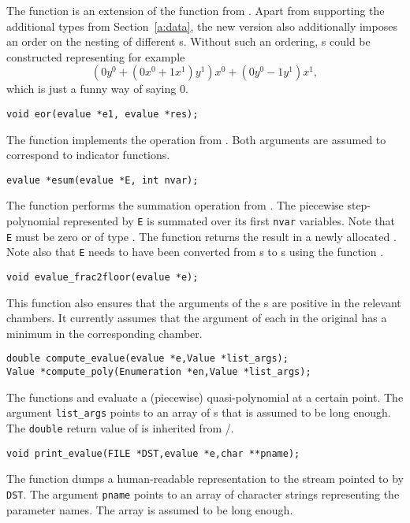 The function  is an extension of the function
 from .
Apart from supporting the additional types from Section~\ref{a:data},
the new version also additionally imposes an order on the nesting of
different s.
Without such an ordering, s could be constructed
representing for example
$$
(0 y^ 0 + ( 0 x^0 + 1 x^1 ) y^1 ) x^0 + (0 y^0 - 1 y^1) x^1
,
$$
which is just a funny way of saying $0$.

\begin{verbatim}
void eor(evalue *e1, evalue *res);
\end{verbatim}
The function  implements the 
operation from .  Both arguments
are assumed to correspond to indicator functions.

\begin{verbatim}
evalue *esum(evalue *E, int nvar);
\end{verbatim}
The function  performs the summation
operation from .
The piecewise step-polynomial represented by \verb+E+ is summated
over its first \verb+nvar+ variables.
Note that \verb+E+ must be zero or of type .
The function returns the result in a newly allocated 
.
Note also that \verb+E+ needs to have been converted
from s to s using
the function .
\begin{verbatim}
void evalue_frac2floor(evalue *e);
\end{verbatim}
This function also ensures that the arguments of the
s are positive in the relevant chambers.
It currently assumes that the argument of each
 in the original 
has a minimum in the corresponding chamber.

\begin{verbatim}
double compute_evalue(evalue *e,Value *list_args);
Value *compute_poly(Enumeration *en,Value *list_args);
\end{verbatim}
The functions  and
 evaluate a (piecewise) quasi-polynomial
at a certain point.  The argument \verb+list_args+
points to an array of s that is assumed
to be long enough.
The \verb+double+ return value of 
is inherited from \PolyLib/.

\begin{verbatim}
void print_evalue(FILE *DST,evalue *e,char **pname);
\end{verbatim}
The function  dumps a human-readable
representation to the stream pointed to by \verb+DST+.
The argument \verb+pname+ points 
to an array of character strings representing the parameter names.
The array is assumed to be long enough.

